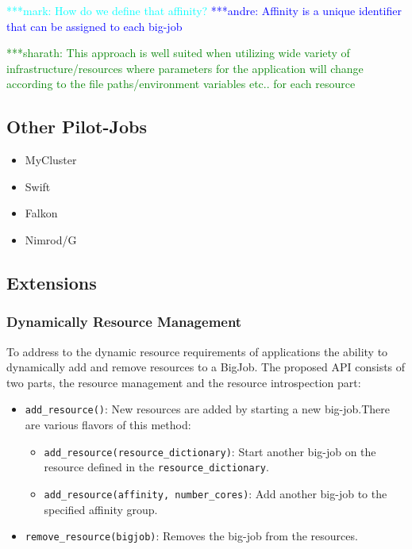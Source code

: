 \documentclass[]{article}
\newcommand{\alnote}[1]{ {\textcolor{blue} { ***andre: #1 }}}
\newcommand{\smnote}[1]{ {\textcolor{green} { ***sharath: #1 }}}
\newcommand{\msnote}[1]{ {\textcolor{cyan} { ***mark: #1 }}}
\newcommand{\alnote}[1]{}
\newcommand{\smnote}[1]{}
\begin{document}

\msnote{How do we define that affinity?}\alnote{Affinity is a unique identifier 
that can be assigned to each big-job}

\smnote{This approach is well suited when utilizing wide variety of
infrastructure/resources where parameters for the application will change
according to the file paths/environment variables etc.. for each resource}

\subsection{Other Pilot-Jobs}

\begin{itemize}
    \item MyCluster
    \item Swift
    \item Falkon
    \item Nimrod/G
\end{itemize}


\subsection{Extensions}


\subsubsection{Dynamically Resource Management}

To address to the dynamic resource requirements of applications the ability to
dynamically add and remove resources to a BigJob. The proposed API consists of
two parts, the resource management and the resource introspection part:
\begin{itemize}
    \item \texttt{add\_resource()}: New resources are added by starting a new
    big-job.There are various flavors of this method:
    \begin{itemize}
        \item \texttt{add\_resource(re\-sour\-ce\_dic\-tionary)}: Start another big-job on the resource defined in the \texttt{resource\_dictionary}.
        \item \texttt{add\_resource(affinity, number\_cores)}: Add another big-job to the specified affinity group.
    \end{itemize}
    \item \texttt{remove\_resource(bigjob)}: Removes the big-job from the
    resources.
\end{itemize}
\end{document}

